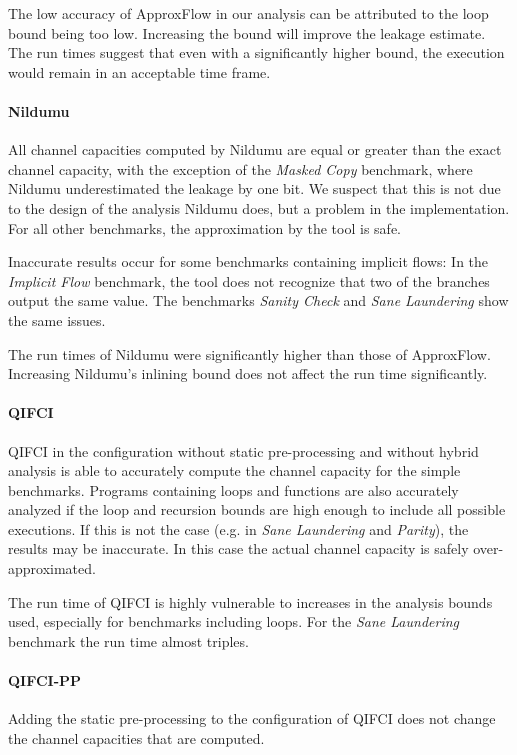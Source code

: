 The low accuracy of ApproxFlow in our analysis can be attributed to the loop bound being too low. Increasing the bound will improve the leakage estimate. The run times suggest that even with a significantly higher bound, the execution would remain in an acceptable time frame.

\paragraph{Nildumu}
All channel capacities computed by Nildumu are equal or greater than the exact channel capacity, with the exception of the \emph{Masked Copy} benchmark, where Nildumu underestimated the leakage by one bit. We suspect that this is not due to the design of the analysis Nildumu does, but a problem in the implementation. For all other benchmarks, the approximation by the tool is safe.

Inaccurate results occur for some benchmarks containing implicit flows: In the \emph{Implicit Flow} benchmark, the tool does not recognize that two of the branches output the same value. The benchmarks \emph{Sanity Check} and \emph{Sane Laundering} show the same issues.

The run times of Nildumu were significantly higher than those of ApproxFlow. Increasing Nildumu's inlining bound does not affect the run time significantly.

\paragraph{QIFCI}
QIFCI in the configuration without static pre-processing and without hybrid analysis is able to accurately compute the channel capacity for the simple benchmarks. Programs containing loops and functions are also accurately analyzed if the loop and recursion bounds are high enough to include all possible executions. If this is not the case (e.g. in \emph{Sane Laundering} and \emph{Parity}), the results may be inaccurate. In this case the actual channel capacity is safely over-approximated.

The run time of QIFCI is highly vulnerable to increases in the analysis bounds used, especially for benchmarks including loops. For the \emph{Sane Laundering} benchmark the run time almost triples.

\paragraph{QIFCI-PP}
Adding the static pre-processing to the configuration of QIFCI does not change the channel capacities that are computed.

